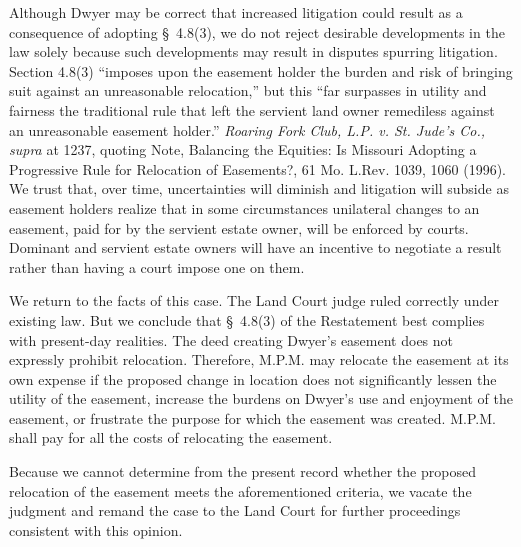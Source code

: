 Although Dwyer may be correct that increased litigation could result as a
consequence of adopting \S~4.8(3), we do not reject desirable developments in
the law solely because such developments may result in disputes spurring
litigation. Section 4.8(3) ``imposes upon the easement holder the burden and
risk of bringing suit against an unreasonable relocation,'' but this {}``far
surpasses in utility and fairness the traditional rule that left the servient
land owner remediless against an unreasonable easement holder.'' \textit{Roaring
Fork Club, L.P. v. St. Jude's Co., supra} at 1237, quoting Note, Balancing the
Equities: Is Missouri Adopting a Progressive Rule for Relocation of Easements?,
61 Mo. L.Rev. 1039, 1060 (1996). We trust that, over time, uncertainties will
diminish and litigation will subside as easement holders realize that in some
circumstances unilateral changes to an easement, paid for by the servient estate
owner, will be enforced by courts. Dominant and servient estate owners will have
an incentive to negotiate a result rather than having a court impose one on
them. 

We return to the facts of this case. The Land Court judge ruled correctly under
existing law. But we conclude that \S~4.8(3) of the Restatement best complies
with present-day realities. The deed creating Dwyer's easement does not
expressly prohibit relocation. Therefore, M.P.M. may relocate the easement at
its own expense if the proposed change in location does not significantly lessen
the utility of the easement, increase the burdens on Dwyer's use and enjoyment
of the easement, or frustrate the purpose for which the easement was created.
M.P.M. shall pay for all the costs of relocating the easement.

Because we cannot determine from the present record whether the proposed
relocation of the easement meets the aforementioned criteria, we vacate the
judgment and remand the case to the Land Court for further proceedings
consistent with this opinion.

